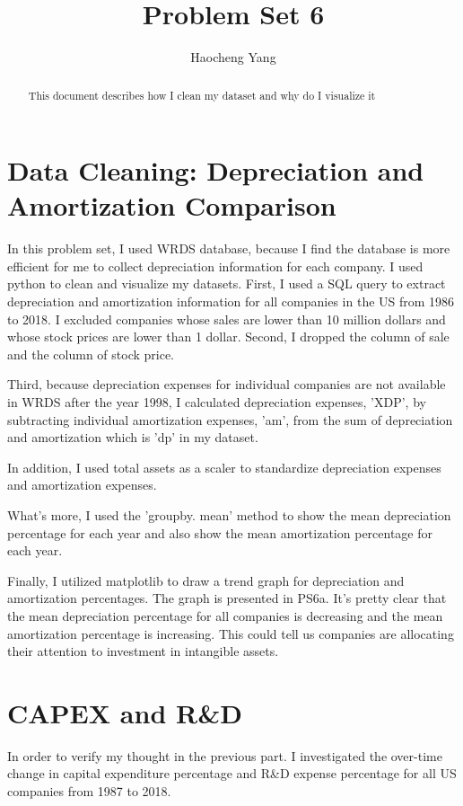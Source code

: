 \documentclass{article}
\title{Problem Set 6}
\author{Haocheng Yang}
\begin{document}
\maketitle

\begin{abstract}
This document describes how I clean my dataset and why do I visualize it 
\end{abstract}

\section{Data Cleaning: Depreciation and Amortization Comparison}
In this problem set, I used WRDS database, because I find the database is more efficient for me to collect depreciation information for each company. I used python to clean and visualize my datasets. 
First, I used a SQL query to extract depreciation and amortization information for all companies in the US from 1986 to 2018. I excluded companies whose sales are lower than 10 million dollars and whose stock prices are lower than 1 dollar. 
Second, I dropped the column of sale and the column of stock price.

Third, because depreciation expenses for individual companies are not available in WRDS after the year 1998, I calculated depreciation expenses, 'XDP', by subtracting individual amortization expenses, 'am', from the sum of depreciation and amortization which is 'dp' in my dataset.

In addition, I used total assets as a scaler to standardize depreciation expenses and amortization expenses.

What's more, I used the 'groupby. mean' method to show the mean depreciation percentage for each year and also show the mean amortization percentage for each year.

Finally, I utilized matplotlib to draw a trend graph for depreciation and amortization percentages. The graph is presented in PS6a. It's pretty clear that the mean depreciation percentage for all companies is decreasing and the mean amortization percentage is increasing. This could tell us companies are allocating their attention to investment in intangible assets. 


\section{CAPEX and R&D}
In order to verify my thought in the previous part. I investigated the over-time change in capital expenditure percentage and R&D expense percentage for all US companies from 1987 to 2018.
\end{document}
